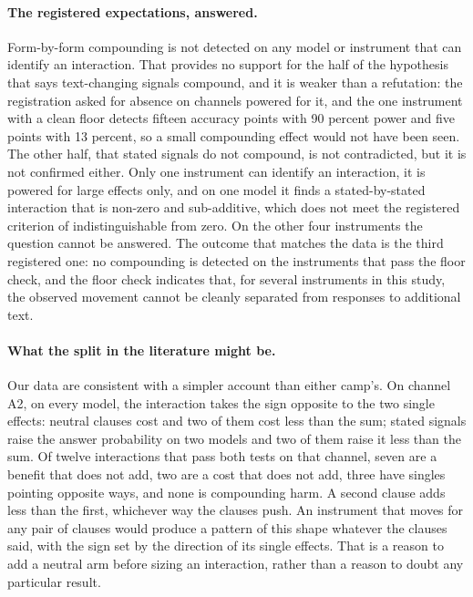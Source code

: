 \documentclass[11pt]{article}
\begin{document}
\paragraph{The registered expectations, answered.} Form-by-form compounding is not detected on any model or instrument that can
identify an interaction. That provides no support for the half of the hypothesis
that says text-changing signals compound, and it is weaker than a refutation:
the registration asked for absence on channels powered for it, and the one
instrument with a clean floor detects fifteen accuracy points with 90 percent
power and five points with 13 percent, so a small compounding effect would not
have been seen. The other half, that stated signals do not compound, is not
contradicted, but it is not confirmed either. Only one instrument can identify
an interaction, it is powered for large effects only, and on one model it finds
a stated-by-stated interaction that is non-zero and sub-additive, which does not
meet the registered criterion of indistinguishable from zero. On the other four
instruments the question cannot be answered. The outcome that matches the data is the third registered one: no compounding
is detected on the instruments that pass the floor check, and the floor check
indicates that, for several instruments in this
study, the observed movement cannot be cleanly separated from responses to
additional text.

\paragraph{What the split in the literature might be.} Our data are consistent
with a simpler account than either camp's. On channel A2, on every model, the
interaction takes the sign opposite to the two single effects: neutral clauses
cost and two of them cost less than the sum; stated signals raise the answer
probability on two models and two of them raise it less than the sum. Of twelve
interactions that pass both tests on that channel, seven are a benefit that does
not add, two are a cost that does not add, three have singles pointing opposite
ways, and none is compounding harm. A second clause adds less than the first,
whichever way the clauses push. An instrument that moves for any pair of clauses would produce a pattern of this
shape whatever the clauses said, with the sign set by the direction of its single
effects. That is a reason to add a neutral arm before sizing an interaction, rather than
a reason to doubt any particular result.
\end{document}
